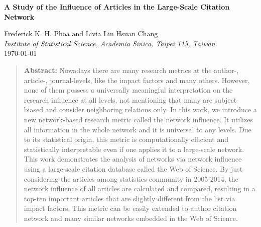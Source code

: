 \documentclass[11pt]{article} %
\begin{document}
\begin{center}
{\Large\bf A Study of the Influence of Articles in the Large-Scale Citation Network}
\end{center}

\begin{center}
Frederick K. H. Phoa and Livia Lin Hsuan Chang\\
{\em Institute of Statistical Science, Academia Sinica, Taipei 115, Taiwan.}\\

\today
\end{center}

\begin{quote} {\bf Abstract:}
Nowadays there are many research metrics at the author-, article-, journal-levels, like the impact factors and many others. However, none of them possess a universally meaningful interpretation on the research influence at all levels, not mentioning that many are subject-biased and consider neighboring relations only. In this work, we introduce a new network-based research metric called the network influence. It utilizes all information in the whole network and it is universal to any levels. Due to its statistical origin, this metric is computationally efficient and statistically interpretable even if one applies it to a large-scale network. This work demonstrates the analysis of networks via network influence using a large-scale citation database called the Web of Science. By just considering the articles among statistics community in 2005-2014, the network influence of all articles are calculated and compared, resulting in a top-ten important articles that are slightly different from the list via impact factors. This metric can be easily extended to author citation network and many similar networks embedded in the Web of Science.
\end{quote}
\end{document}
